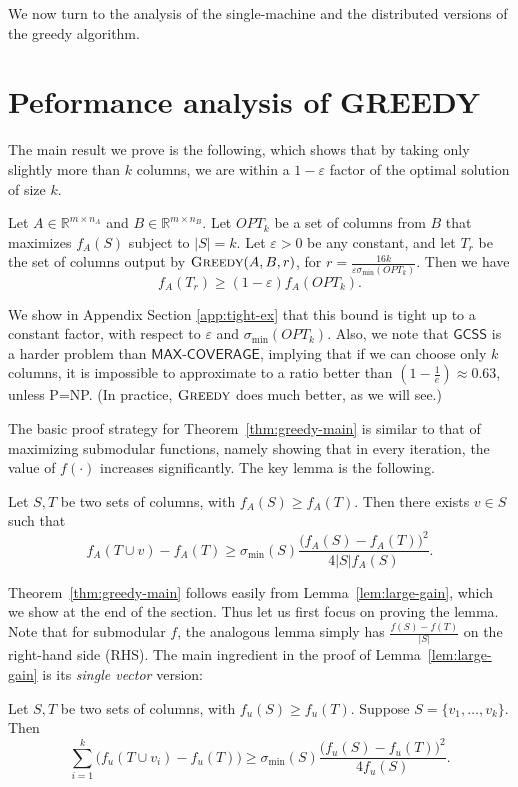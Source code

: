 \documentclass{article}
\newcommand{\Real}{\mathbb{R}}
\newcommand{\eps}{\varepsilon}
\newcommand{\greedy}{\textsc{Greedy}}
\newcommand{\gcss}{\textsf{GCSS}}
\newcommand{\maxcoverage}{\textsf{MAX-COVERAGE}}
\begin{document}
We now turn to the analysis of the single-machine and the distributed versions of the greedy algorithm.


\section{Peformance analysis of GREEDY} \label{section-3}

The main result we prove is the following, which shows that by taking only slightly more than $k$ columns, we are within a $1 -\eps$ factor of the optimal solution of size $k$.

\begin{thm} \label{thm:greedy-main}
Let $A \in \Real^{m \times n_A}$ and $B \in \Real^{m \times n_B}$. Let $OPT_k$ be a set of columns from $B$ that maximizes $f_A(S)$ subject to $|S| = k$.  Let $\eps > 0$ be any constant, and let $T_r$ be the set of columns output by $\greedy(A, B, r)$, for $r = \frac{16k}{\eps \sigma_{\min}(OPT_k)}$. Then we have$$f_A(T_r) \geq (1 - \eps) f_A(OPT_k).$$
\end{thm}

We show in Appendix Section \ref{app:tight-ex} that this bound is tight up to a constant factor, with respect to $\eps$ and $\sigma_{\min}(OPT_k)$. Also, we note that $\gcss$ is a harder problem than $\maxcoverage$, implying that if we can choose only $k$ columns, it is impossible to approximate to a ratio better than $(1-\frac{1}{e}) \approx 0.63$, unless P=NP. (In practice, $\greedy$ does much better, as we will see.)

The basic proof strategy for Theorem~\ref{thm:greedy-main} is similar to that of maximizing submodular functions, namely showing that in every iteration, the value of $f(\cdot)$ increases significantly. The key lemma is the following.

\begin{lemma} \label{lem:large-gain}
Let $S, T$ be two sets of columns, with $f_A(S) \ge f_A(T)$.  Then there exists $v \in S$ such that
\[ f_A(T \cup v) - f_A(T) \ge \sigma_{\min}(S) \frac{\big(f_A(S) - f_A(T)\big)^2}{4|S|f_A(S)}.\]
\end{lemma}

Theorem~\ref{thm:greedy-main} follows easily from Lemma~\ref{lem:large-gain}, which we show at the end of the section. Thus let us first focus on proving the lemma.  Note that for submodular $f$, the analogous lemma simply has $\frac{f(S) - f(T)}{|S|}$ on the right-hand side (RHS).
The main ingredient in the proof of Lemma~\ref{lem:large-gain} is its {\em single vector} version:
\begin{lemma}\label{lem:one-vector}
Let $S, T$ be two sets of columns, with $f_u(S) \ge f_u(T)$. Suppose $S=\{v_1, \dots, v_k\}$.  Then
\[ \sum_{i=1}^k \Big( f_u(T \cup v_i) - f_u(T) \Big) \ge \sigma_{\min}(S) \frac{\big(f_u(S) - f_u(T)\big)^2}{4f_u(S)}.\]
\end{lemma}
\end{document}
